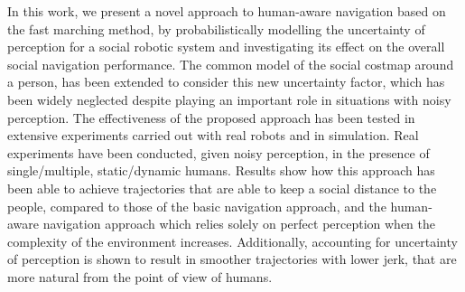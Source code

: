 In this work, we present a novel approach to human-aware navigation based on the fast marching method, by probabilistically modelling the uncertainty of perception for a social robotic system and investigating its effect on the overall social navigation performance. The common model of the social costmap around a person, has been extended to consider this new uncertainty factor, which has been widely neglected despite playing an important role in situations with noisy perception.  
The effectiveness of the proposed approach has been tested in extensive experiments carried out with real robots and in simulation. Real experiments have been conducted, given noisy perception, in the presence of single/multiple, static/dynamic humans. Results show how this approach has been able to achieve trajectories that are able to keep a social distance to the people, compared to those of the basic navigation approach, and the human-aware navigation approach which relies solely on perfect perception when the complexity of the environment increases. Additionally, accounting for uncertainty of perception is shown to result in smoother trajectories with lower jerk, that are more natural from the point of view of humans. 



